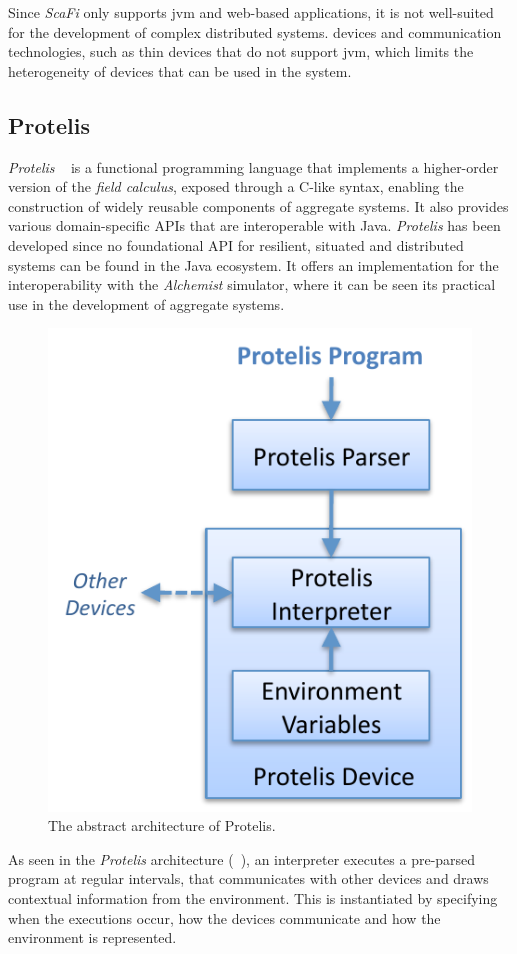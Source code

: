 Since \emph{ScaFi} only supports \ac{jvm} and web-based applications, it is not well-suited for the development of complex distributed systems.
devices and communication technologies, such as thin devices that do not support \ac{jvm}, which limits the heterogeneity of
devices that can be used in the system.

\subsection{Protelis}
\label{subsec:protelis}
\emph{Protelis} ~\cite{10.1145/2695664.2695913} is a functional programming language that implements a higher-order version of the \emph{field calculus},
exposed through a C-like syntax, enabling the construction of widely reusable components of aggregate systems.
It also provides various domain-specific APIs that are interoperable with Java.
\emph{Protelis} has been developed since no foundational API for resilient, situated and distributed systems can be found
in the Java ecosystem.
It offers an implementation for the interoperability with the \emph{Alchemist} simulator, where it can be seen its
practical use in the development of aggregate systems.

\begin{figure}
    \centering
    \includegraphics[width=.5\linewidth]{figures/protelis-structure}
    \caption{The abstract architecture of Protelis.}
    \label{fig:protelis-structure}
\end{figure}

As seen in the \emph{Protelis} architecture (~), an interpreter executes a pre-parsed program at regular intervals,
that communicates with other devices and draws contextual information from the environment.
This is instantiated by specifying when the executions occur, how the devices communicate and how the environment is
represented.

